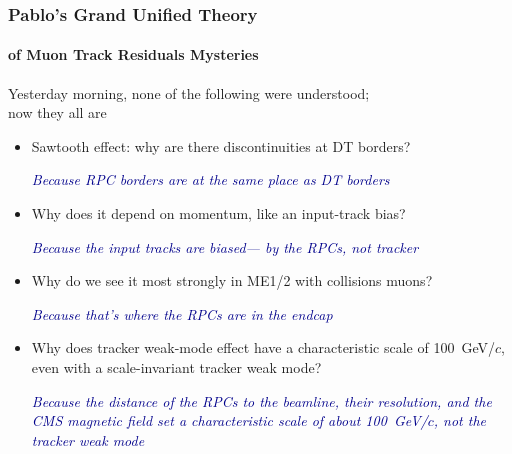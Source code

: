 \documentclass[compress]{beamer}
\begin{document}
\begin{frame}
\frametitle{Pablo's Grand Unified Theory}
\framesubtitle{of Muon Track Residuals Mysteries}
Yesterday morning, none of the following were understood; \\ now they all are

\begin{itemize}\setlength{\itemsep}{0.2 cm}
\item Sawtooth effect: why are there discontinuities at DT borders?

\textcolor{darkblue}{\it Because RPC borders are at the same place as DT borders}

\item Why does it depend on momentum, like an input-track bias?

\textcolor{darkblue}{\it Because the input tracks are biased--- by the RPCs, not tracker}

\item Why do we see it most strongly in ME1/2 with collisions muons?

\textcolor{darkblue}{\it Because that's where the RPCs are in the endcap}

\item Why does tracker weak-mode effect have a characteristic scale of
  100~GeV/$c$, even with a scale-invariant tracker weak mode?

\textcolor{darkblue}{\it Because the distance of the RPCs to the beamline, their
  resolution, and the CMS magnetic field set a characteristic scale of
  about 100~GeV/$c$, not the tracker weak mode}

\end{itemize}
\end{frame}
\end{document}
